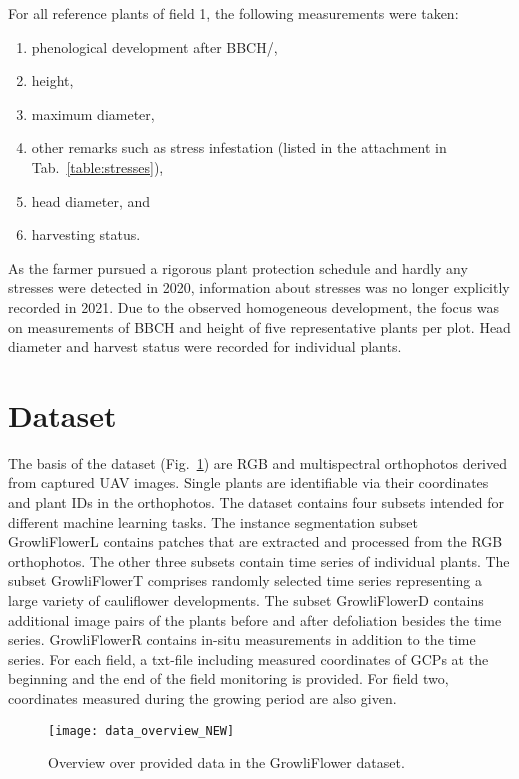 \documentclass{article}
\def\figref#1{Fig.~\ref{#1}}
\def\tabref#1{Tab.~\ref{#1}}
\begin{document}
For all reference plants of field 1, the following measurements were taken:
\begin{enumerate}
\item phenological development after BBCH/\cite{feller1995phenological}, 
\item height,
\item maximum diameter,
\item other remarks such as stress infestation (listed in the attachment in \tabref{table:stresses}),
\item head diameter, and
\item harvesting status.
\end{enumerate}
As the farmer pursued a rigorous plant protection schedule and hardly any stresses were detected in 2020, information about stresses was no longer explicitly recorded in 2021. Due to the observed homogeneous development, the focus was on measurements of BBCH and height of five representative plants per plot. Head diameter and harvest status were recorded for individual plants.

\section{Dataset}\label{sec:dataset}
The basis of the dataset (\figref{fig:data_overview}) are RGB and multispectral orthophotos derived from captured UAV images. Single plants are identifiable via their coordinates and plant IDs in the orthophotos. 
The dataset contains four subsets intended for different machine learning tasks.
The instance segmentation subset GrowliFlowerL contains patches that are extracted and processed from the RGB orthophotos.  
The other three subsets contain time series of individual plants. 
The subset GrowliFlowerT comprises randomly selected time series representing a large variety of cauliflower developments.
The subset GrowliFlowerD contains additional image pairs of the plants before and after defoliation besides the time series. 
GrowliFlowerR contains in-situ measurements in addition to the time series.
For each field, a txt-file including measured coordinates of GCPs at the beginning and the end of the field monitoring is provided. For field two, coordinates measured during the growing period are also given.

\begin{figure}[t]
	\centering
    \texttt{[image: data\_overview\_NEW]}
    \caption{Overview over provided data in the GrowliFlower dataset.}
    \label{fig:data_overview}
\end{figure}
\end{document}

